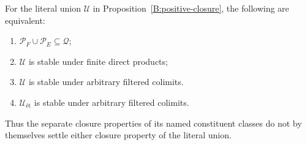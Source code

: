 \begin{proposition}
\label{B:closure-reduction}
For the literal union $\mathcal U$ in
Proposition~\ref{B:positive-closure}, the following are equivalent:
\begin{enumerate}
 \item $\mathcal P_F\cup\mathcal P_E\subseteq\mathcal Q$;
 \item $\mathcal U$ is stable under finite direct products;
 \item $\mathcal U$ is stable under arbitrary filtered colimits.
 \item $\mathcal U_{\text{ét}}$ is stable under arbitrary
 filtered colimits.
\end{enumerate}
Thus the separate closure properties of its named constituent
classes do not by themselves settle either closure property of
the literal union.
\end{proposition}

